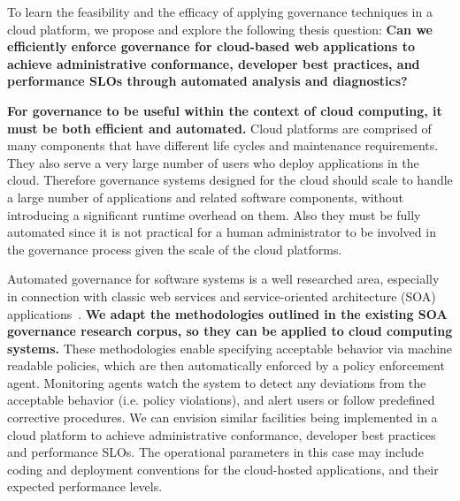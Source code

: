 To learn the feasibility and the efficacy of applying governance
techniques in a cloud platform, we propose and explore the following thesis
question:
{\bf Can we efficiently enforce governance for cloud-based web applications to achieve 
administrative conformance, developer best practices, and performance SLOs through 
automated analysis and diagnostics?} 

\textbf{For governance to be
useful within the context of cloud computing, it must be both efficient and automated.}
Cloud platforms are comprised of many components that have different life cycles
and maintenance requirements. 
They also serve a very large number of users who deploy applications in
the cloud. Therefore governance systems designed for the cloud should scale to handle a 
large number of applications and related software components,
without introducing a significant runtime overhead on them.
Also they must be fully automated since it is not practical for a human administrator to be
involved in the governance process given the scale of the cloud platforms.

Automated governance for software systems is a well researched area,
especially in connection with classic web services and service-oriented architecture 
(SOA) applications~\cite{gartner-soa-gov,soagov,Schepers:2008:LAS:1363686.1363932,5577268,4730489}. 
\textbf{We adapt the methodologies outlined in the existing SOA governance research corpus, so
they can be applied to cloud computing systems.}
These methodologies enable specifying
acceptable behavior via machine readable policies, which are then automatically enforced by
a policy enforcement agent. Monitoring agents watch the system to detect any deviations from
the acceptable behavior (i.e. policy violations), and alert users or follow predefined corrective
procedures. We can envision similar facilities being implemented in a cloud platform to 
achieve administrative conformance, developer best practices and performance SLOs. The operational
parameters in this case may include coding and deployment conventions for the cloud-hosted
applications, and their expected performance levels.

